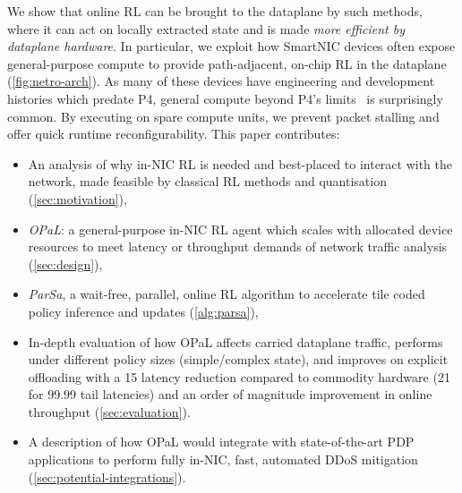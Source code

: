 \documentclass[
conference
,10pt
]{IEEEtran}
\newcommand{\approachshort}{OPaL}
\begin{document}







We show that online RL can be brought to the dataplane by such methods, where it can act on locally extracted state and is made \emph{more efficient by dataplane hardware}.
In particular, we exploit how SmartNIC devices often expose general-purpose compute to provide path-adjacent, on-chip RL in the dataplane (\cref{fig:netro-arch}).
As many of these devices have engineering and development histories which predate P4, general compute beyond P4's limits~\parencite{p4-psa} is surprisingly common.
By executing on spare compute units, we prevent packet stalling and offer quick runtime reconfigurability.
This paper contributes:
\begin{itemize}
	\item An analysis of why in-NIC RL is needed and best-placed to interact with the network, made feasible by classical RL methods and quantisation (\cref{sec:motivation}),
	\item \emph{\approachshort{}}: a general-purpose in-NIC RL agent which scales with allocated device resources to meet latency or throughput demands of network traffic analysis (\cref{sec:design}),
	\item \emph{ParSa}, a wait-free, parallel, online RL algorithm to accelerate tile coded policy inference and updates (\cref{alg:parsa}),
	\item In-depth evaluation of how \approachshort{} affects carried dataplane traffic, performs under different policy sizes (simple/complex state), and improves on explicit offloading with a \SI{15}{\texttimes} latency reduction compared to commodity hardware (\SI{21}{\texttimes} for 99.99 tail latencies) and an order of magnitude improvement in online throughput (\cref{sec:evaluation}).
	\item A description of how \approachshort{} would integrate with state-of-the-art PDP applications to perform fully in-NIC, fast, automated DDoS mitigation (\cref{sec:potential-integrations}).
\end{itemize}
\end{document}
